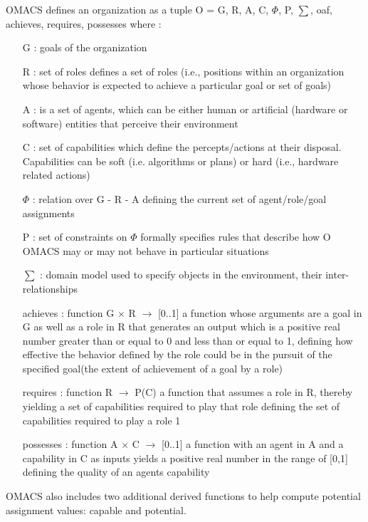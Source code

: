 OMACS defines an organization as a tuple O = \textlangle{} G, R, A, C, $\varPhi$, P, $\sum$, 
oaf, achieves, requires, possesses \textrangle{}
where :
\begin{itemize}
\newcommand{\localtextbulletone}{\textcolor{gray}{\raisebox{.45ex}{\rule{.6ex}{.6ex}}}}
\renewcommand{\labelitemi}{\localtextbulletone}
\item[ G ] 
: goals of the organization 
\item[ R ] 
: set of roles defines a set of roles (i.e., positions within an organization whose behavior
 is expected to achieve a particular goal or set of goals)
\item[ A ] 
: is a set of agents, which can be either human or artificial (hardware or software)
 entities that perceive their environment
\item[ C ] 
: set of capabilities which define the percepts/actions at their disposal. Capabilities can be soft 
(i.e. algorithms or plans) or hard (i.e., hardware related actions)
\item[ $\varPhi$ ] 
: relation over G - R - A defining the current set of agent/role/goal assignments
\item[ P ] 
: set of constraints on $\varPhi$ formally specifies rules that describe how O OMACS may or may not 
 behave in particular situations
\item[ $\sum$ ] 
: domain model used to specify objects in the environment, their inter-relationships
\item[ achieves ] 
: function G $\times$ R $\rightarrow$ {[}0..1{]} a function whose arguments are a goal in G as well
 as a role in R that generates an output which is a positive real number greater than or equal to 0 
 and less than or equal to 1, defining how effective the behavior
 defined by the role could be in the pursuit of the specified goal(the extent of achievement of a goal by a role)
\item[requires] 
: function R $\rightarrow$ P(C) a function that assumes a role in R, thereby yielding a set 
of capabilities required to play that role defining the set of capabilities required to play a role 1
\item[possesses] 
: function A $\times$ C $\rightarrow$ {[}0..1{]} a function with an agent in A and a capability in C 
 as inputs yields a positive real number in the range of [0,1] defining the quality of an agents capability



\end{itemize}
OMACS also includes two additional derived functions to help compute potential assignment values: 
capable and potential.
\cite{omacs0}

